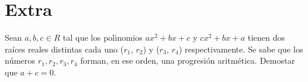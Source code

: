 \section{Extra}
{
    \begin{section-problem}
        Sean $a, b, c \in R$ tal que los polinomios $ax^2 + bx + c$ y $cx^2 + bx + a$
        tienen dos raíces reales distintas cada uno ($r_1$, $r_2$) y ($r_3$, $r_4$) respectivamente.
        Se sabe que los números $r_1, r_2, r_3, r_4$ forman, en ese orden, una progresión aritmética.
        Demostar que $a + c = 0.$
    \end{section-problem}
}\label{sec:extra}
